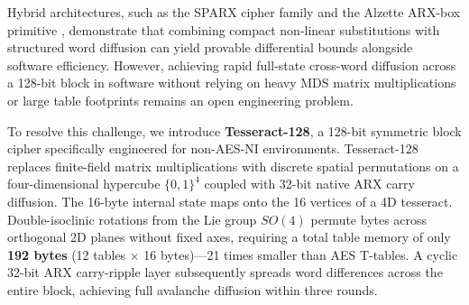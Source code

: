 \documentclass[review,12pt]{elsarticle}
\begin{document}
Hybrid architectures, such as the SPARX cipher family \cite{dunkelman2016sparx} and the Alzette ARX-box primitive \cite{beierle2020alzette}, demonstrate that combining compact non-linear substitutions with structured word diffusion can yield provable differential bounds alongside software efficiency. However, achieving rapid full-state cross-word diffusion across a 128-bit block in software without relying on heavy MDS matrix multiplications or large table footprints remains an open engineering problem.

To resolve this challenge, we introduce \textbf{Tesseract-128}, a 128-bit symmetric block cipher specifically engineered for non-AES-NI environments. Tesseract-128 replaces finite-field matrix multiplications with discrete spatial permutations on a four-dimensional hypercube $\{0,1\}^4$ coupled with 32-bit native ARX carry diffusion. The 16-byte internal state maps onto the 16 vertices of a 4D tesseract. Double-isoclinic rotations from the Lie group $SO(4)$ permute bytes across orthogonal 2D planes without fixed axes, requiring a total table memory of only \textbf{192 bytes} (12 tables $\times$ 16 bytes)---21 times smaller than AES T-tables. A cyclic 32-bit ARX carry-ripple layer subsequently spreads word differences across the entire block, achieving full avalanche diffusion within three rounds.
\end{document}
